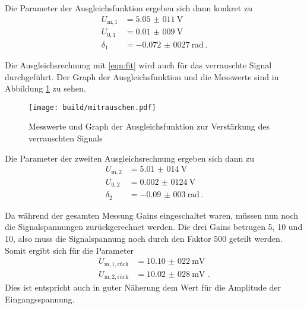 Die Parameter der Ausgleichsfunktion ergeben sich dann konkret zu
\begin{align*}
  U_\mathrm{m,1} &= \SI{5,05(011)}{\volt} \,\\
  U_{0,1} &= \SI{0,01(009)}{\volt} \,\\
  \delta_1 &= \SI{-0,072(0027)}{\radian} \,.
\end{align*}

Die Ausgleichsrechnung mit \eqref{eqn:fit} wird auch für das verrauschte Signal durchgeführt.
Der Graph der Ausgleichsfunktion und die Messwerte sind in Abbildung \ref{fig:rausch}
zu sehen.

\begin{figure}
  \centering
  \texttt{[image: build/mitrauschen.pdf]}
  \caption{Messwerte und Graph der Ausgleichsfunktion zur Verstärkung des verrauschten Signals}
  \label{fig:rausch}
\end{figure}

Die Parameter der zweiten Ausgleichsrechnung ergeben sich dann zu
\begin{align*}
  U_\mathrm{m,2} &= \SI{5,01(014)}{\volt} \,\\
  U_{0,2} &= \SI{0,002(0124)}{\volt} \,\\
  \delta_2 &= \SI{-0,09(003)}{\radian} \,.
\end{align*}

Da während der gesamten Messung Gains eingeschaltet waren, müssen nun noch die
Signalspannungen zurückgerechnet werden. Die drei Gains betrugen 5, 10 und 10, also
muss die Signalspannung noch durch den Faktor 500 geteilt werden. Somit ergibt
sich für die Parameter
\begin{align*}
  U_\mathrm{m,1,rück} &= \SI{10,10(022)}{\milli\volt} \,\\
  U_\mathrm{m,2,rück} &= \SI{10,02(028)}{\milli\volt} \, \,.
\end{align*}
Dies ist entspricht auch in guter Näherung dem Wert für die  Amplitude der
Eingangsspannung.
